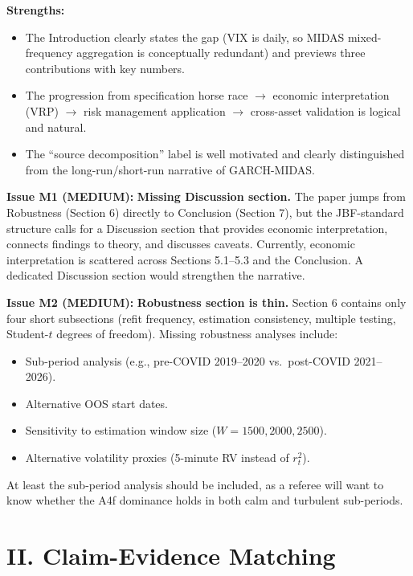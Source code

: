 \documentclass[12pt,a4paper]{article}
\begin{document}
\textcolor{okgreen}{\textbf{Strengths:}}
\begin{itemize}
\item The Introduction clearly states the gap (VIX is daily, so MIDAS mixed-frequency aggregation is conceptually redundant) and previews three contributions with key numbers.
\item The progression from specification horse race $\to$ economic interpretation (VRP) $\to$ risk management application $\to$ cross-asset validation is logical and natural.
\item The ``source decomposition'' label is well motivated and clearly distinguished from the long-run/short-run narrative of GARCH-MIDAS.
\end{itemize}

\textcolor{warncolor}{\textbf{Issue M1 (MEDIUM):}} \textbf{Missing Discussion section.} The paper jumps from Robustness (Section 6) directly to Conclusion (Section 7), but the JBF-standard structure calls for a Discussion section that provides economic interpretation, connects findings to theory, and discusses caveats. Currently, economic interpretation is scattered across Sections 5.1--5.3 and the Conclusion. A dedicated Discussion section would strengthen the narrative.

\textcolor{warncolor}{\textbf{Issue M2 (MEDIUM):}} \textbf{Robustness section is thin.} Section 6 contains only four short subsections (refit frequency, estimation consistency, multiple testing, Student-$t$ degrees of freedom). Missing robustness analyses include:
\begin{itemize}
\item Sub-period analysis (e.g., pre-COVID 2019--2020 vs.\ post-COVID 2021--2026).
\item Alternative OOS start dates.
\item Sensitivity to estimation window size ($W = 1500, 2000, 2500$).
\item Alternative volatility proxies (5-minute RV instead of $r_t^2$).
\end{itemize}
At least the sub-period analysis should be included, as a referee will want to know whether the A4f dominance holds in both calm and turbulent sub-periods.


\section*{II. Claim-Evidence Matching}
\end{document}
